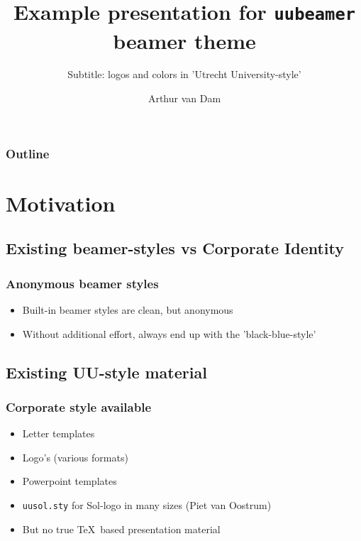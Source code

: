 
\title[uubeamer example presentation]{Example presentation for \texttt{uubeamer} beamer theme}
\subtitle{Subtitle: logos and colors in 'Utrecht University-style'}

\author[\url{http://www.math.uu.nl/people/dam/}]{Arthur van Dam}




\begin{frame}
\titlepage
\end{frame}


\begin{frame}
  \frametitle{Outline}
  \tableofcontents
\end{frame}

\section{Motivation}%

\subsection{Existing beamer-styles vs Corporate Identity}%

\begin{frame}
\frametitle{Anonymous beamer styles}
\begin{itemize}
\item Built-in beamer styles are clean, but anonymous
\item Without additional effort, always end up with the 'black-blue-style'
\end{itemize}
\end{frame}


\subsection{Existing UU-style material}%

\begin{frame}
\frametitle{Corporate style available}
\begin{itemize}
\item Letter templates
\item Logo's (various formats)
\item Powerpoint templates
\item \texttt{uusol.sty} for Sol-logo in many sizes (Piet van Oostrum)
\item But no true \TeX~based presentation material
\end{itemize}
\end{frame}

